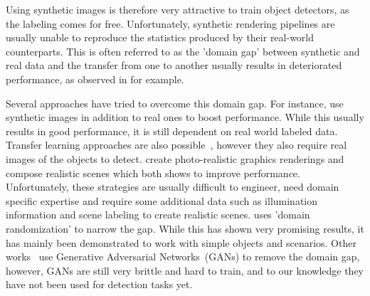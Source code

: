 \documentclass[10pt,twocolumn,letterpaper]{article}
\newcommand{\paulrmk}[1]{{\color{DarkMagenta}\bf #1}}
\newcommand{\comment}[1]{}
\begin{document}
 
Using synthetic images  is therefore very attractive to  train object detectors,
as the  labeling comes for  free.  Unfortunately, synthetic  rendering pipelines
are  usually unable  to reproduce  the statistics  produced by  their real-world
counterparts.  This is  often referred to as the 'domain  gap' between synthetic
and  real  data  and  the  transfer  from one  to  another  usually  results  in
deteriorated performance, as observed in \cite{Tobin17} for example.


Several  approaches have  tried  to  overcome this  domain  gap.  For  instance,
\cite{Dwibedi17,Georgakis17,Rad17c}  use synthetic  images in  addition to  real
ones to boost  performance.  While this usually results in  good performance, it
is still dependent on real world labeled data.  Transfer learning approaches are
also possible~\cite{Rozantsev17,bousmalis2016domain,ganin2016domain}, however  they also require real  images of the
objects to  detect.  \cite{Gupta16,  Alhaija17} create  photo-realistic graphics
renderings and \cite{Gupta16, Alhaija17, Georgakis17, Varol17} compose realistic
scenes which both shows to improve performance.  Unfortunately, these strategies
are usually difficult to engineer, need domain specific expertise and require some
additional data  such as illumination  information and scene labeling  to create
realistic scenes.  \cite{Tobin17} uses 'domain randomization' to narrow the gap.
While this has shown very promising  results, it has mainly been demonstrated to
work       with      simple       objects       and      scenarios.        Other
works~\cite{Shrivastava16,Bousmalis17}      use      Generative      Adversarial
Networks~(GANs) to  remove the domain gap,  however, GANs are still very brittle
and hard to train, and to our knowledge they have not been used for detection
tasks yet.




\end{document}
